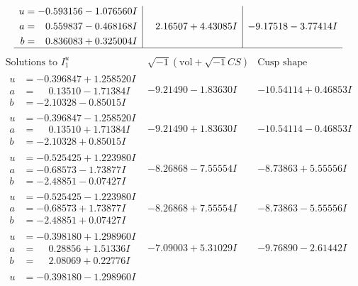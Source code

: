 \documentclass[1p]{elsarticle_modified}
\theoremstyle{definition}
\newcommand{\I}{\sqrt{-1}}
\begin{document}
$$\begin{array}{c|c|c}
\begin{aligned}
u &= -0.593156 - 1.076560 I \\
a &= \phantom{-}0.559837 - 0.468168 I \\
b &= \phantom{-}0.836083 + 0.325004 I\end{aligned}
 & \phantom{-}2.16507 + 4.43085 I & -9.17518 - 3.77414 I\\
 \hline 
 \end{array}$$\newpage$$\begin{array}{c|c|c}  
\text{Solutions to }I^u_{1}& \I (\text{vol} + \sqrt{-1}CS) & \text{Cusp shape}\\
 \hline 
\begin{aligned}
u &= -0.396847 + 1.258520 I \\
a &= \phantom{-}0.13510 - 1.71384 I \\
b &= -2.10328 - 0.85015 I\end{aligned}
 & -9.21490 - 1.83630 I & -10.54114 + 0.46853 I \\ \hline\begin{aligned}
u &= -0.396847 - 1.258520 I \\
a &= \phantom{-}0.13510 + 1.71384 I \\
b &= -2.10328 + 0.85015 I\end{aligned}
 & -9.21490 + 1.83630 I & -10.54114 - 0.46853 I \\ \hline\begin{aligned}
u &= -0.525425 + 1.223980 I \\
a &= -0.68573 - 1.73877 I \\
b &= -2.48851 - 0.07427 I\end{aligned}
 & -8.26868 - 7.55554 I & -8.73863 + 5.55556 I \\ \hline\begin{aligned}
u &= -0.525425 - 1.223980 I \\
a &= -0.68573 + 1.73877 I \\
b &= -2.48851 + 0.07427 I\end{aligned}
 & -8.26868 + 7.55554 I & -8.73863 - 5.55556 I \\ \hline\begin{aligned}
u &= -0.398180 + 1.298960 I \\
a &= \phantom{-}0.28856 + 1.51336 I \\
b &= \phantom{-}2.08069 + 0.22776 I\end{aligned}
 & -7.09003 + 5.31029 I & -9.76890 - 2.61442 I \\ \hline\begin{aligned}
u &= -0.398180 - 1.298960 I \\

\end{aligned}
\end{array}$$
\end{document}
